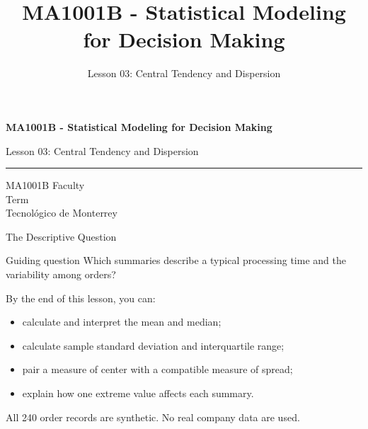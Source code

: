 \documentclass[aspectratio=169,10pt,english]{beamer}
\title{MA1001B - Statistical Modeling for Decision Making}
\subtitle{Lesson 03: Central Tendency and Dispersion}
\author{}
\institute{Tecnol\'ogico de Monterrey}
\date{}
\begin{document}
\begin{frame}[plain]
  \vspace{1.2cm}
  {\Large\bfseries MA1001B - Statistical Modeling for Decision Making\par}
  \vspace{0.7cm}
  {\large Lesson 03: Central Tendency and Dispersion\par}
  \vspace{0.7cm}
  {\color{TecRojo}\rule{\textwidth}{1.2pt}}
  \vspace{0.8cm}

  MA1001B Faculty\\[0.3cm]
  Term\\[0.3cm]
  Tecnol\'ogico de Monterrey
\end{frame}

\begin{frame}{The Descriptive Question}
  \begin{alertblock}{Guiding question}
    Which summaries describe a typical processing time and the variability
    among orders?
  \end{alertblock}

  \vspace{0.5em}
  By the end of this lesson, you can:
  \begin{itemize}
    \item calculate and interpret the mean and median;
    \item calculate sample standard deviation and interquartile range;
    \item pair a measure of center with a compatible measure of spread;
    \item explain how one extreme value affects each summary.
  \end{itemize}

  \vfill
  \scriptsize All 240 order records are synthetic. No real company data are used.
\end{frame}
\end{document}
